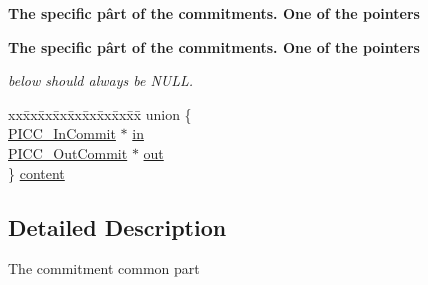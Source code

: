 \begin{Indent}{\bf The specific pârt of the commitments. One of the pointers}\par
\end{Indent}
\begin{Indent}{\bf The specific pârt of the commitments. One of the pointers}\par
{\em below should always be N\-U\-L\-L. }\begin{DoxyCompactItemize}
\item 
\begin{tabbing}
xx\=xx\=xx\=xx\=xx\=xx\=xx\=xx\=xx\=\kill
union \{\\
\>\hyperlink{commit_8h_a0f71a22c7590232b08181e5cc63de548}{PICC\_InCommit} $\ast$ \hyperlink{struct__PICC__Commit_a745a1a078043d4467bfa29ebf5d08a5b}{in}\\
\>\hyperlink{commit_8h_aecc9149969ed6c8695575a3c520b5bf2}{PICC\_OutCommit} $\ast$ \hyperlink{struct__PICC__Commit_a7ec6ea1ae1ab4b2b46da706874b4adda}{out}\\
\} \hyperlink{struct__PICC__Commit_a64f32e0f5452a5abf31a90440b13be6e}{content}\\

\end{tabbing}\end{DoxyCompactItemize}
\end{Indent}


\subsection{Detailed Description}
The commitment common part 

